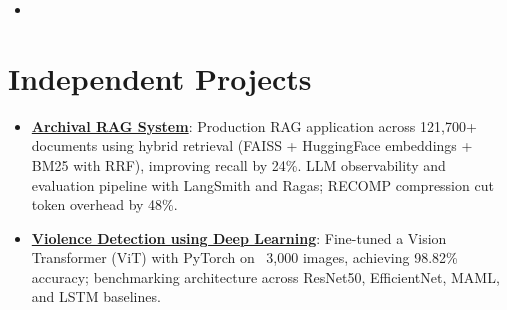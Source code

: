 \documentclass[11pt,a4paper,sans]{moderncv}
\begin{document}
\begin{itemize}
\vspace{3pt}

\item{}

\end{itemize}


\section{Independent Projects}
\vspace{1pt}
\begin{itemize}

\item \textbf{\href{https://github.com/your-github/example-project-2}{Archival RAG System}}: Production RAG application across 121,700+ documents using hybrid retrieval (FAISS + HuggingFace embeddings + BM25 with RRF), improving recall by 24\%. LLM observability and evaluation pipeline with LangSmith and Ragas; RECOMP compression cut token overhead by 48\%.

\item \textbf{\href{https://github.com/your-github/example-project-3}{Violence Detection using Deep Learning}}: Fine-tuned a Vision Transformer (ViT) with PyTorch on ~3,000 images, achieving 98.82\% accuracy; benchmarking architecture across ResNet50, EfficientNet, MAML, and LSTM baselines.

\end{itemize}

\end{document}
